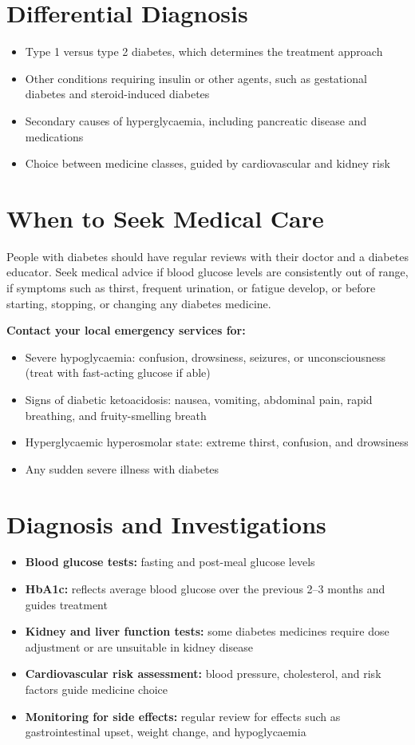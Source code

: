 \section*{Differential Diagnosis}
\begin{itemize}
    \item Type 1 versus type 2 diabetes, which determines the treatment approach
    \item Other conditions requiring insulin or other agents, such as gestational diabetes and steroid-induced diabetes
    \item Secondary causes of hyperglycaemia, including pancreatic disease and medications
    \item Choice between medicine classes, guided by cardiovascular and kidney risk
\end{itemize}

\section*{When to Seek Medical Care}
People with diabetes should have regular reviews with their doctor and a diabetes educator. Seek medical advice if blood glucose levels are consistently out of range, if symptoms such as thirst, frequent urination, or fatigue develop, or before starting, stopping, or changing any diabetes medicine.

\textbf{Contact your local emergency services for:}
\begin{itemize}
    \item Severe hypoglycaemia: confusion, drowsiness, seizures, or unconsciousness (treat with fast-acting glucose if able)
    \item Signs of diabetic ketoacidosis: nausea, vomiting, abdominal pain, rapid breathing, and fruity-smelling breath
    \item Hyperglycaemic hyperosmolar state: extreme thirst, confusion, and drowsiness
    \item Any sudden severe illness with diabetes
\end{itemize}

\section*{Diagnosis and Investigations}
\begin{itemize}
    \item \textbf{Blood glucose tests:} fasting and post-meal glucose levels
    \item \textbf{HbA1c:} reflects average blood glucose over the previous 2--3 months and guides treatment
    \item \textbf{Kidney and liver function tests:} some diabetes medicines require dose adjustment or are unsuitable in kidney disease
    \item \textbf{Cardiovascular risk assessment:} blood pressure, cholesterol, and risk factors guide medicine choice
    \item \textbf{Monitoring for side effects:} regular review for effects such as gastrointestinal upset, weight change, and hypoglycaemia
\end{itemize}

